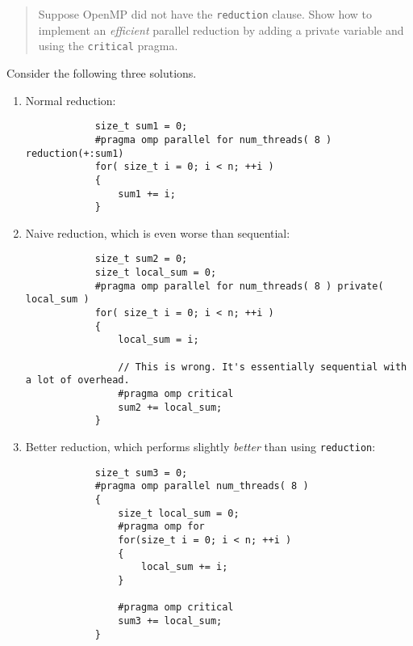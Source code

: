 \documentclass{article}
\begin{document}
\section{}
    \begin{quote}
        Suppose OpenMP did not have the \texttt{reduction} clause. Show how to implement an \textit{efficient} parallel reduction by adding a private variable and using the \texttt{critical} pragma.
    \end{quote}

    Consider the following three solutions.

    \begin{enumerate}
        \item Normal reduction: \begin{verbatim}
            size_t sum1 = 0;
            #pragma omp parallel for num_threads( 8 ) reduction(+:sum1)
            for( size_t i = 0; i < n; ++i )
            {
                sum1 += i;
            }
        \end{verbatim}

        \item Naive reduction, which is even worse than sequential: \begin{verbatim}
            size_t sum2 = 0;
            size_t local_sum = 0;
            #pragma omp parallel for num_threads( 8 ) private( local_sum )
            for( size_t i = 0; i < n; ++i )
            {
                local_sum = i;

                // This is wrong. It's essentially sequential with a lot of overhead.
                #pragma omp critical
                sum2 += local_sum;
            }
        \end{verbatim}

        \item Better reduction, which performs slightly \textit{better} than using \texttt{reduction}: \begin{verbatim}
            size_t sum3 = 0;
            #pragma omp parallel num_threads( 8 )
            {
                size_t local_sum = 0;
                #pragma omp for
                for(size_t i = 0; i < n; ++i )
                {
                    local_sum += i;
                }

                #pragma omp critical
                sum3 += local_sum;
            }
        \end{verbatim}
    \end{enumerate}
\end{document}
